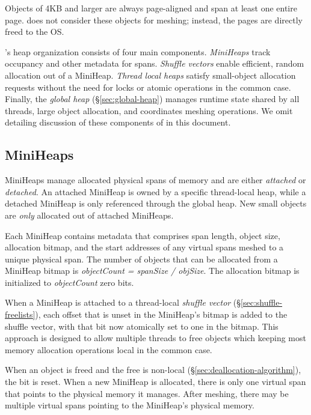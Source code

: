 Objects of 4KB and larger are always page-aligned and span at least one
entire page. \Mesh does not consider these objects for meshing;
instead, the pages are directly freed to the OS.

\Mesh's heap organization consists of four main components.
\emph{MiniHeaps} track occupancy and other metadata for spans.
\textit{Shuffle vectors} enable efficient,
random allocation out of a MiniHeap. %
\textit{Thread local heaps} satisfy small-object allocation requests
without the need for locks or atomic operations in the common case.
Finally, the \textit{global heap}
(\S\ref{sec:global-heap}) manages runtime state shared by all threads,
large object allocation, and coordinates meshing operations.
We omit detailing discussion of these components of \Mesh in this document.


\iffalse

\subsection{MiniHeaps}
\label{sec:miniheaps}

MiniHeaps manage allocated physical spans of memory and are either
\emph{attached} or \emph{detached}.  An attached MiniHeap is owned by
a specific thread-local heap, while a detached MiniHeap is only
referenced through the global heap.  New small objects are
\textit{only} allocated out of attached MiniHeaps.

Each MiniHeap contains metadata that comprises span length, object
size, allocation bitmap, and the start addresses of any virtual spans
meshed to a unique physical span.  The number of objects that can be
allocated from a MiniHeap bitmap is \textit{objectCount = spanSize /
  objSize}.  The allocation bitmap is initialized to
\textit{objectCount} zero bits.

When a MiniHeap is attached to a
thread-local \emph{shuffle vector} (\S\ref{sec:shuffle-freelists}),
each offset that is unset in the MiniHeap's bitmap is added to the
shuffle vector, with that bit now atomically set to one in the bitmap.
This approach is designed to allow multiple threads to free objects
which keeping most memory allocation operations local in the common
case.

When an object is freed and the free is non-local
(\S\ref{sec:deallocation-algorithm}), the bit is reset.  When a new
MiniHeap is allocated, there is only one virtual span that points to
the physical memory it manages. After meshing, there may be multiple
virtual spans pointing to the MiniHeap's physical memory.


